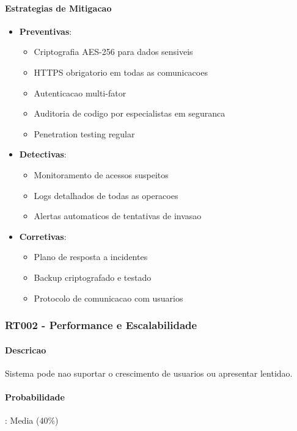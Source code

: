 \paragraph{Estrategias de Mitigacao}
\begin{itemize}
    \item \textbf{Preventivas}:
    \begin{itemize}
        \item Criptografia AES-256 para dados sensiveis
        \item HTTPS obrigatorio em todas as comunicacoes
        \item Autenticacao multi-fator
        \item Auditoria de codigo por especialistas em seguranca
        \item Penetration testing regular
    \end{itemize}
    \item \textbf{Detectivas}:
    \begin{itemize}
        \item Monitoramento de acessos suspeitos
        \item Logs detalhados de todas as operacoes
        \item Alertas automaticos de tentativas de invasao
    \end{itemize}
    \item \textbf{Corretivas}:
    \begin{itemize}
        \item Plano de resposta a incidentes
        \item Backup criptografado e testado
        \item Protocolo de comunicacao com usuarios
    \end{itemize}
\end{itemize}

\subsubsection{RT002 - Performance e Escalabilidade}

\paragraph{Descricao}
Sistema pode nao suportar o crescimento de usuarios ou apresentar lentidao.

\paragraph{Probabilidade}: Media (40\%)
